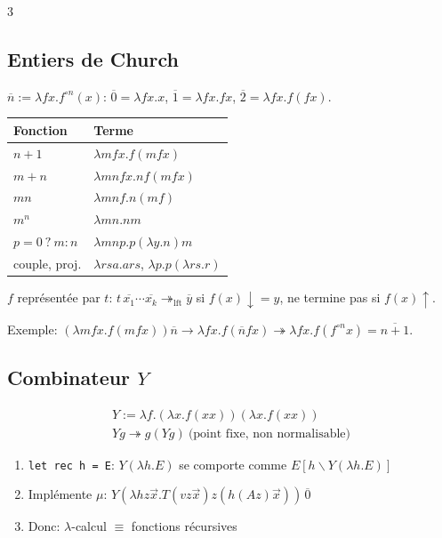 \documentclass[12pt, a4paper]{article}
\newcommand{\dv}{{\downarrow}}
\newcommand{\uv}{{\uparrow}}
\begin{document}
\begin{multicols*}{3}
	\subsection{Entiers de Church}
	$\overline n:=\lambda fx.f^{\circ n}(x)$: $\overline0=\lambda fx.x$, $\overline1=\lambda fx.fx$, $\overline2=\lambda fx.f(fx)$.

	\begin{tabular}{|l|l|}
		\hline
		\textbf{Fonction}       & \textbf{Terme}                 \\
		\hline
		$n+1$                   & $\lambda mfx.f(mfx)$           \\
		$m+n$                   & $\lambda mnfx.nf(mfx)$         \\
		$mn$                    & $\lambda mnf.n(mf)$            \\
		$m^n$                   & $\lambda mn.nm$                \\
		$p=0\ ?\ m:n$           & $\lambda mnp.p(\lambda y.n)m$  \\
		couple, proj.           & $\lambda rsa.ars$, $\lambda p.p(\lambda rs.r)$ \\
		\hline
	\end{tabular}

	$f$ représentée par $t$: $t\,\overline{x_1}\cdots\overline{x_k}\twoheadrightarrow_{\text{lft}}\overline y$ si $f(x)\dv=y$, ne termine pas si $f(x)\uv$.

	Exemple: $(\lambda mfx.f(mfx))\overline n\to\lambda fx.f(\overline nfx)\twoheadrightarrow\lambda fx.f(f^{\circ n}x)=\overline{n+1}$.

	\subsection{Combinateur $Y$}
	\begin{gather*}
		Y:=\lambda f.(\lambda x.f(xx))(\lambda x.f(xx))\\
		Yg\twoheadrightarrow g(Yg)\ \text{(point fixe, non normalisable)}
	\end{gather*}
	\begin{enumerate}[\roman*.]
		\item \texttt{let rec h = E}: $Y(\lambda h.E)$ se comporte comme $E[h\backslash Y(\lambda h.E)]$
		\item Implémente $\mu$: $Y(\lambda hz\vec x.T(vz\vec x)z(h(Az)\vec x))\,\overline0$
		\item Donc: $\lambda$-calcul $\equiv$ fonctions récursives
	\end{enumerate}


\end{multicols*}
\end{document}
